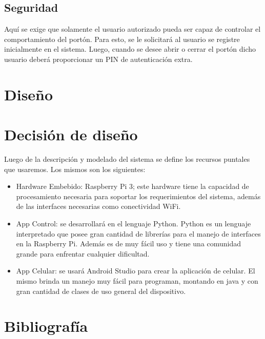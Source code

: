 \documentclass[16pt, article,notitlepage]{article}
\begin{document}
\subsection{Seguridad}
Aquí se exige que solamente el usuario autorizado pueda ser capaz de controlar el comportamiento del portón. Para esto, se le solicitará al usuario se registre inicialmente en el sistema. Luego, cuando se desee abrir o cerrar el portón dicho usuario deberá proporcionar un PIN de autenticación extra.
\section{Diseño}


\section{Decisión de diseño}
Luego de la descripción y modelado del sistema se define los recursos puntales que usaremos. Los mismos son los siguientes:

\begin{itemize}
	\item   Hardware Embebido: Raspberry Pi 3; este hardware tiene la capacidad de procesamiento necesaria para soportar los requerimientos del sistema, además de las interfaces necesarias como conectividad WiFi.
	\item App Control: se desarrollará en el lenguaje Python. Python es un lenguaje interpretado que posee gran cantidad de librerías para el manejo de interfaces en la Raspberry Pi. Además es de muy fácil uso y tiene una comunidad grande para enfrentar cualquier dificultad.
	\item   App Celular: se usará Android Studio para crear la aplicación de celular. El mismo brinda un manejo muy fácil para programan, montando en java y con gran cantidad de clases de uso general del dispositivo.
	
\end{itemize}

\section{Bibliografía}



\end{document}
